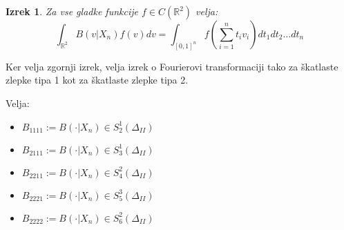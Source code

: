 \documentclass[12pt]{article}
\newtheorem{theorem}{Izrek}
\begin{document}
\begin{theorem}
Za vse gladke funkcije $f \in C(\mathbb{R}^2)$ velja:
$$\int_{\mathbb{R}^2} B(v|X_n) f(v) dv = \int_{[0,1]^n} f(\sum_{i=1}^n t_i v_i) dt_1 dt_2 \ldots dt_n$$
\end{theorem}

Ker velja zgornji izrek, velja izrek o Fourierovi transformaciji tako za škatlaste zlepke tipa 1 kot za škatlaste zlepke tipa 2. 

Velja:
\begin{itemize}
\item $B_{1111} := B(\cdot | X_n) \in S_{2}^1 (\Delta_{II})$
\item $B_{2111} := B(\cdot | X_n) \in S_{3}^1 (\Delta_{II})$
\item $B_{2211} := B(\cdot | X_n) \in S_{4}^2 (\Delta_{II})$
\item $B_{2221} := B(\cdot | X_n) \in S_{5}^3 (\Delta_{II})$
\item $B_{2222} := B(\cdot | X_n) \in S_{6}^2 (\Delta_{II})$
\end{itemize}
\end{document}
